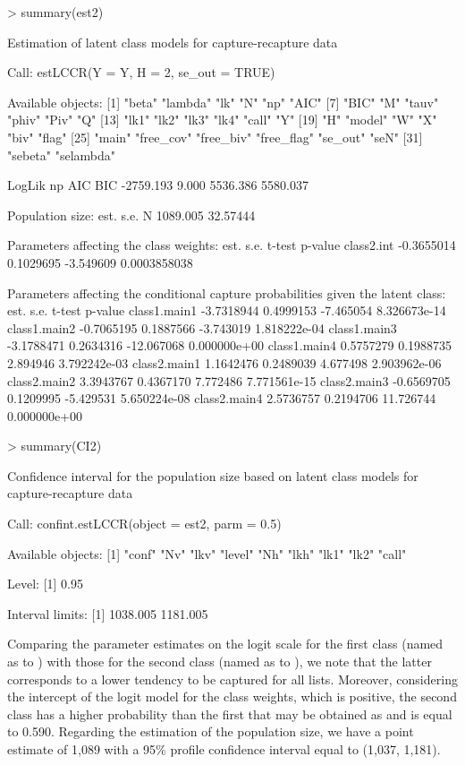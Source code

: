 \begin{example*}
> summary(est2)

Estimation of latent class models for capture-recapture data

Call:
estLCCR(Y = Y, H = 2, se_out = TRUE)

Available objects:
 [1] "beta"      "lambda"    "lk"        "N"         "np"        "AIC"
 [7] "BIC"       "M"         "tauv"      "phiv"      "Piv"       "Q"
[13] "lk1"       "lk2"       "lk3"       "lk4"       "call"      "Y"
[19] "H"         "model"     "W"         "X"         "biv"       "flag"
[25] "main"      "free_cov"  "free_biv"  "free_flag" "se_out"    "seN"
[31] "sebeta"    "selambda"

   LogLik        np       AIC       BIC
-2759.193     9.000  5536.386  5580.037

Population size:
      est.     s.e.
N 1089.005 32.57444

Parameters affecting the class weights:
                 est.      s.e.    t-test      p-value
class2.int -0.3655014 0.1029695 -3.549609 0.0003858038

Parameters affecting the conditional capture probabilities given the latent class:
                   est.      s.e.     t-test      p-value
class1.main1 -3.7318944 0.4999153  -7.465054 8.326673e-14
class1.main2 -0.7065195 0.1887566  -3.743019 1.818222e-04
class1.main3 -3.1788471 0.2634316 -12.067068 0.000000e+00
class1.main4  0.5757279 0.1988735   2.894946 3.792242e-03
class2.main1  1.1642476 0.2489039   4.677498 2.903962e-06
class2.main2  3.3943767 0.4367170   7.772486 7.771561e-15
class2.main3 -0.6569705 0.1209995  -5.429531 5.650224e-08
class2.main4  2.5736757 0.2194706  11.726744 0.000000e+00

> summary(CI2)

Confidence interval for the population size based on latent class models
for capture-recapture data

Call:
confint.estLCCR(object = est2, parm = 0.5)

Available objects:
[1] "conf"  "Nv"    "lkv"   "level" "Nh"    "lkh"   "lk1"   "lk2"   "call"

Level:
[1] 0.95

Interval limits:
[1] 1038.005 1181.005
\end{example*}
%
Comparing the parameter estimates on the logit scale for the first class (named as  to ) with those for the second class (named as  to ), we note that the latter corresponds to a lower tendency to be captured for all lists.
Moreover, considering the intercept of the logit model for the class weights, which is positive, the second class has a higher probability than the first that may be obtained as  and is equal to 0.590.
Regarding the estimation of the population size, we have a point estimate of 1,089 with a 95\% profile confidence interval equal to (1,037, 1,181).

